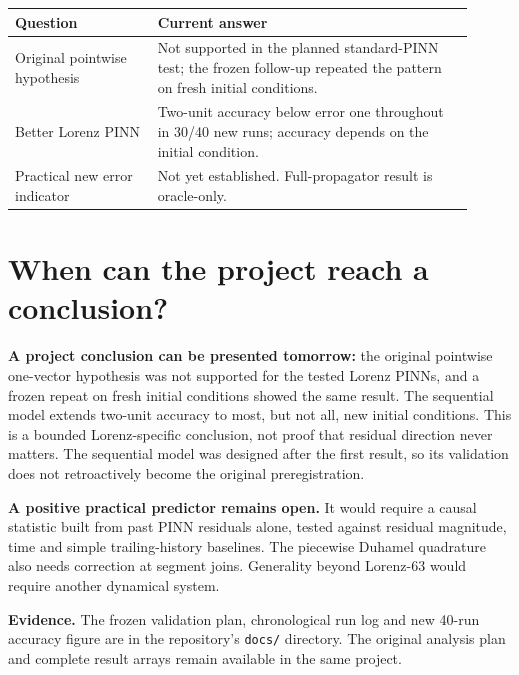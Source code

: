 \documentclass[11pt,a4paper]{article}
\begin{document}
\begin{center}
\begin{tabular}{p{0.29\linewidth}p{0.62\linewidth}}
\toprule
Question & Current answer\\
\midrule
Original pointwise hypothesis & Not supported in the planned standard-PINN
test; the frozen follow-up repeated the pattern on fresh initial conditions.\\
Better Lorenz PINN & Two-unit accuracy below error one throughout in 30/40
new runs; accuracy depends on the initial condition.\\
Practical new error indicator & Not yet established. Full-propagator result is
oracle-only.\\
\bottomrule
\end{tabular}
\end{center}

\section*{When can the project reach a conclusion?}
\textbf{A project conclusion can be presented tomorrow:} the original
pointwise one-vector hypothesis was not supported for the tested Lorenz
PINNs, and a frozen repeat on fresh initial conditions showed the same
result. The sequential model extends two-unit accuracy to most, but not all,
new initial conditions. This is a bounded Lorenz-specific conclusion, not
proof that residual direction never matters. The sequential model was
designed after the first result, so its validation does not retroactively
become the original preregistration.

\textbf{A positive practical predictor remains open.} It would require a
causal statistic built from past PINN residuals alone, tested against
residual magnitude, time and simple trailing-history baselines. The
piecewise Duhamel quadrature also needs correction at segment joins.
Generality beyond Lorenz-63 would require another dynamical system.

\noindent\textbf{Evidence.} The frozen validation plan, chronological run
log and new 40-run accuracy figure are in the repository's \texttt{docs/}
directory. The original analysis plan and complete result arrays remain
available in the same project.
\end{document}
